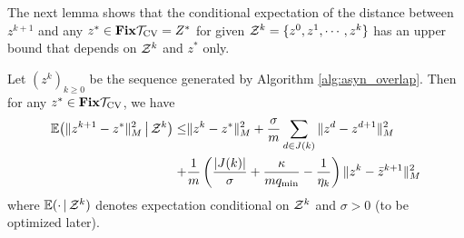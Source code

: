 The next lemma shows that the conditional expectation of the distance between $z^{k+1}$ 
and any $z^*\in \mathbf{Fix} {{\mathcal{T}}_{\textnormal{CV}}}=Z^*$ for given ${\mathcal{Z}}^k=\{z^0,z^1,\cdots,z^k\}$ has an
upper bound that depends on ${\mathcal{Z}}^k$ and $z^*$ only.
\begin{lemma}\label{lemma:fund}
Let $(z^k)_{k\geq 0}$ be the sequence generated by Algorithm
\ref{alg:asyn_overlap}.  Then for
any $z^*\in \mathbf{Fix} {{\mathcal{T}}_{\textnormal{CV}}}$, we have
\begin{align}\label{eqn:fund_inquality0}
\begin{aligned}
\mathbb{E}\big(\|z^{k+1} - z^* \|_M^2 \,\big|\, \cZ^k\big)  \leq & \|z^{k} - z^*
\|_M^2  +{\sigma\over m}\sum_{d\in J(k)}\|z^d-z^{d+1}\|_M^2\\
+& {1\over m}\left({{|J(k)|}\over \sigma}+{\kappa\over
mq_{\min}}-{1\over \eta_k}\right)\|z^k-\bar z^{k+1}\|_M^2
\end{aligned}
\end{align}
where $\mathbb{E}(\cdot\,|\,{\mathcal{Z}}^k)$ denotes expectation  conditional on ${\mathcal{Z}}^k$ and $\sigma>0$ (to be optimized later).
\end{lemma}
